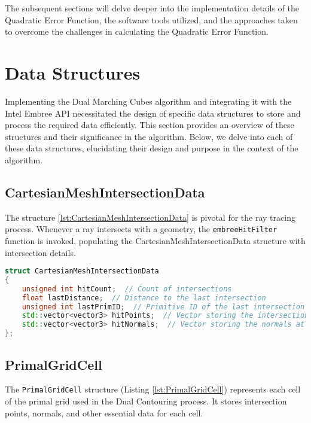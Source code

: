 The subsequent sections will delve deeper into the implementation details of the Quadratic Error Function, the software tools utilized, and the approaches taken to overcome the challenges in calculating the Quadratic Error Function.

\section{Data Structures} \label{Data-Structures}

Implementing the Dual Marching Cubes algorithm and integrating it with the Intel Embree API necessitated the design of specific data structures to store and process the required data efficiently. This section provides an overview of these structures and their significance in the algorithm. Below, we delve into each of these data structures, elucidating their design and purpose in the context of the algorithm.

\subsection{CartesianMeshIntersectionData}

The structure \ref{lst:CartesianMeshIntersectionData} is pivotal for the ray tracing process. Whenever a ray intersects with a geometry, the \texttt{embreeHitFilter} function is invoked, populating the CartesianMeshIntersectionData structure with intersection details.

\vspace{2mm}
\begin{lstlisting}[language=C++, caption=CartesianMeshIntersectionData structure, label=lst:CartesianMeshIntersectionData]
struct CartesianMeshIntersectionData
{
    unsigned int hitCount;  // Count of intersections
    float lastDistance;  // Distance to the last intersection
    unsigned int lastPrimID;  // Primitive ID of the last intersection
    std::vector<vector3> hitPoints;  // Vector storing the intersection points
    std::vector<vector3> hitNormals;  // Vector storing the normals at the intersection points
};
\end{lstlisting}


\subsection{PrimalGridCell} \label{PrimalGridCell}

The \texttt{PrimalGridCell} structure (Listing \ref{lst:PrimalGridCell}) represents each cell of the primal grid used in the Dual Contouring process. It stores intersection points, normals, and other essential data for each cell.

